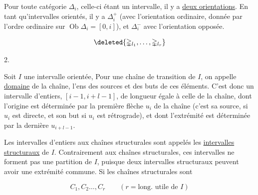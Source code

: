 Pour toute catégorie $\mathbb{\Delta}_i$, celle-ci étant un intervalle, il y a  \uline{deux orientations}.  En tant qu'intervalles orientés, il y a $\mathbb{\Delta}_i^+$ (avec l'orientation ordinaire, donnée par l'ordre ordinaire sur $\operatorname{Ob}\mathbb{\Delta}_i=[0,i]$), et $\mathbb{\Delta}_i^-$ avec l'orientation opposée.



\[\deleted{\mathbb{\Delta}_{l_1},\ldots,\mathbb{\Delta}_{l_r}}\]




2.  

Soit $I$ une  intervalle orientée,  Pour une chaîne    de transition de $I$, on appelle \uline{domaine} de la chaîne, l'ens des sources et des buts de ces éléments. C'est donc un intervalle d'entiers, $[i-1,i+l-1]$, de longueur  égale à celle de la chaîne, dont l'origine est déterminée par la première flèche $u_i$ de la chaîne (c'est sa source, si $u_i$ est directe, et son but si $u_i$ est rétrograde), et dont l'extrémité est déterminée par la dernière $u_{i+l-1}$.

Les intervalles d'entiers   aux chaînes structurales sont appelés les \uline{intervalles structuraux}  de $I$. Contrairement aux chaînes structurales, ces intervalles ne forment pas une partition de $I$, puisque deux intervalles structuraux peuvent avoir une extrémité commune. Si les chaînes structurales sont

\[C_1,C_2\ldots,C_r\qquad (r=\text{long. utile de }I)\]

